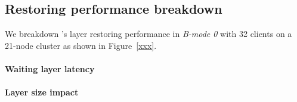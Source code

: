 \subsection{Restoring performance breakdown}

We breakdown \sysname's layer restoring performance in \emph{B-mode 0} with 32 clients on a 21-node cluster as shown in Figure~\ref{xxx}.%








\paragraph{Waiting layer latency}

\paragraph{Layer size impact}

